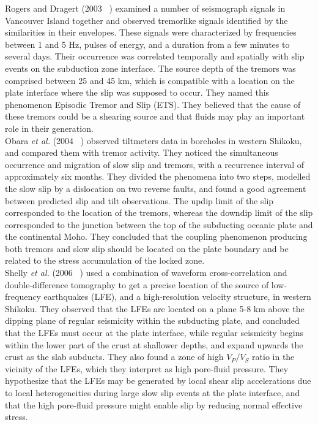 \documentclass[main.tex]{subfiles}
\begin{document}
Rogers and Dragert (2003 ~\cite{ROG_2003}) examined a number of seismograph signals in Vancouver Island together and observed tremorlike signals identified by the similarities in their envelopes. These signals were characterized by frequencies between 1 and 5 Hz, pulses of energy, and a duration from a few minutes to several days. Their occurrence was correlated temporally and spatially with slip events on the subduction zone interface. The source depth of the tremors was comprised between 25 and 45 km, which is compatible with a location on the plate interface where the slip was supposed to occur. They named this phenomenon Episodic Tremor and Slip (ETS). They believed that the cause of these tremors could be a shearing source and that fluids may play an important role in their generation. \\

Obara \textit{et al.} (2004 ~\cite{OBA_2004}) observed tiltmeters data in boreholes in western Shikoku, and compared them with tremor activity. They noticed the simultaneous occurrence and migration of slow slip and tremors, with a recurrence interval of approximately six months. They divided the phenomena into two steps, modelled the slow slip by a dislocation on two reverse faults, and found a good agreement between predicted slip and tilt observations. The updip limit of the slip corresponded to the location of the tremors, whereas the downdip limit of the slip corresponded to the junction between the top of the subducting oceanic plate and the continental Moho. They concluded that the coupling phenomenon producing both tremors and slow slip should be located on the plate boundary  and be related to the stress accumulation of the locked zone.\\

Shelly \textit{et al.} (2006 ~\cite{SHE_2006}) used a combination of waveform cross-correlation and double-difference tomography to get a precise location of the source of low-frequency earthquakes (LFE), and a high-resolution velocity structure, in western Shikoku. They observed that the LFEs are located on a plane 5-8 km above the dipping plane of regular seismicity within the subducting plate, and concluded that the LFEs must occur at the plate interface, while regular seismicity begins within the lower part of the crust at shallower depths, and expand upwards the crust as the slab subducts. They also found a zone of high $V_P / V_S$ ratio in the vicinity of the LFEs, which they interpret as high pore-fluid pressure. They hypothesize that the LFEs may be generated by local shear slip accelerations due to local heterogeneities during large slow slip events at the plate interface, and that the high pore-fluid pressure might enable slip by reducing normal effective stress. \\
\end{document}
